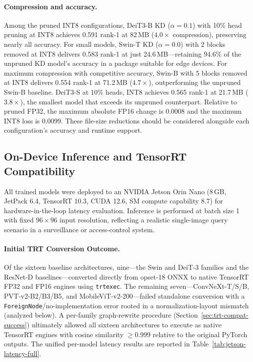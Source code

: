 \documentclass[runningheads,a4paper]{llncs}
\begin{document}
\paragraph{Compression and accuracy.}
Among the pruned INT8 configurations, DeiT3-B KD ($\alpha{=}0.1$) with 10\% head pruning at INT8 achieves 0.591 rank-1 at 82\,MB ($4.0\times$ compression), preserving nearly all accuracy. For small models, Swin-T KD ($\alpha{=}0.0$) with 2 blocks removed at INT8 delivers 0.583 rank-1 at just 24.6\,MB---retaining 94.6\% of the unpruned KD model's accuracy in a package suitable for edge devices. For maximum compression with competitive accuracy, Swin-B with 5 blocks removed at INT8 delivers 0.554 rank-1 at 71.2\,MB ($4.7\times$), outperforming the unpruned Swin-B baseline. DeiT3-S at 10\% heads, INT8 achieves 0.565 rank-1 at 21.7\,MB ($3.8\times$), the smallest model that exceeds its unpruned counterpart. Relative to pruned FP32, the maximum absolute FP16 change is 0.0008 and the maximum INT8 loss is 0.0099. These file-size reductions should be considered alongside each configuration's accuracy and runtime support.

\subsection{On-Device Inference and TensorRT Compatibility}\label{sec:trt-compat}

All trained models were deployed to an NVIDIA Jetson Orin Nano (8\,GB, JetPack 6.4, TensorRT 10.3, CUDA 12.6, SM compute capability 8.7) for hardware-in-the-loop latency evaluation. Inference is performed at batch size 1 with fixed $96\times96$ input resolution, reflecting a realistic single-image query scenario in a surveillance or access-control system.

\paragraph{Initial TRT Conversion Outcome.}
Of the sixteen baseline architectures, nine---the Swin and DeiT-3 families and the ResNet-D baselines---converted directly from opset-18 ONNX to native TensorRT FP32 and FP16 engines using \texttt{trtexec}. The remaining seven---ConvNeXt-T/S/B, PVT-v2-B2/B3/B5, and MobileViT-v2-200---failed standalone conversion with a \texttt{ForeignNode}/no-implementation error rooted in a normalization-layout mismatch (analyzed below). A per-family graph-rewrite procedure (Section~\ref{sec:trt-compat-success}) ultimately allowed all sixteen architectures to execute as native TensorRT engines with cosine similarity $\geq 0.999$ relative to the original PyTorch outputs. The unified per-model latency results are reported in Table~\ref{tab:jetson-latency-full}.
\end{document}
